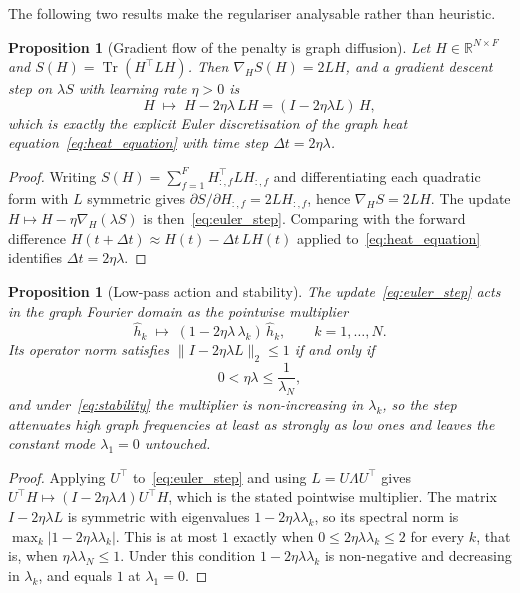 \documentclass[11pt,reqno]{amsart}
\theoremstyle{plain}
\newtheorem{proposition}[theorem]{Proposition}
\theoremstyle{definition}
\theoremstyle{remark}
\numberwithin{equation}{section}
\newcommand{\R}{\mathbb{R}}
\newcommand{\Tr}{\operatorname{Tr}}
\begin{document}
The following two results make the regulariser analysable rather than heuristic.

\begin{proposition}[Gradient flow of the penalty is graph diffusion]
\label{prop:gradient_diffusion}
Let $H\in\R^{N\times F}$ and $S(H)=\Tr(H^{\top}LH)$. Then
$\nabla_{H} S(H) = 2LH$, and a gradient descent step on $\lambda S$ with
learning rate $\eta>0$ is
\begin{equation}
\label{eq:euler_step}
H \;\longmapsto\; H - 2\eta\lambda\, L H = (I - 2\eta\lambda L)\,H ,
\end{equation}
which is exactly the explicit Euler discretisation of the graph heat
equation~\eqref{eq:heat_equation} with time step $\Delta t = 2\eta\lambda$.
\end{proposition}

\begin{proof}
Writing $S(H)=\sum_{f=1}^{F} H_{:,f}^{\top} L H_{:,f}$ and differentiating each
quadratic form with $L$ symmetric gives
$\partial S/\partial H_{:,f} = 2L H_{:,f}$, hence $\nabla_H S = 2LH$. The update
$H \mapsto H-\eta\nabla_H(\lambda S)$ is then~\eqref{eq:euler_step}. Comparing
with the forward difference $H(t+\Delta t) \approx H(t) - \Delta t\,LH(t)$
applied to~\eqref{eq:heat_equation} identifies $\Delta t = 2\eta\lambda$.
\end{proof}

\begin{proposition}[Low-pass action and stability]
\label{prop:lowpass}
The update~\eqref{eq:euler_step} acts in the graph Fourier domain as the
pointwise multiplier
\begin{equation}
\hat h_k \;\longmapsto\; (1-2\eta\lambda\,\lambda_k)\,\hat h_k ,
\qquad k=1,\dots,N .
\end{equation}
Its operator norm satisfies $\|I-2\eta\lambda L\|_2 \le 1$ if and only if
\begin{equation}
\label{eq:stability}
0 < \eta\lambda \le \frac{1}{\lambda_N},
\end{equation}
and under~\eqref{eq:stability} the multiplier is non-increasing in $\lambda_k$,
so the step attenuates high graph frequencies at least as strongly as low ones
and leaves the constant mode $\lambda_1=0$ untouched.
\end{proposition}

\begin{proof}
Applying $U^{\top}$ to~\eqref{eq:euler_step} and using $L=U\Lambda U^{\top}$
gives $U^{\top}H \mapsto (I-2\eta\lambda\Lambda)U^{\top}H$, which is the stated
pointwise multiplier. The matrix $I-2\eta\lambda L$ is symmetric with eigenvalues
$1-2\eta\lambda\lambda_k$, so its spectral norm is
$\max_k |1-2\eta\lambda\lambda_k|$. This is at most $1$ exactly when
$0\le 2\eta\lambda\lambda_k \le 2$ for every $k$, that is, when
$\eta\lambda\lambda_N \le 1$. Under this condition
$1-2\eta\lambda\lambda_k$ is non-negative and decreasing in $\lambda_k$, and
equals $1$ at $\lambda_1 = 0$.
\end{proof}
\end{document}
